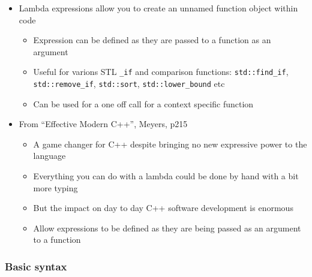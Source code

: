 \begin{itemize}
\tightlist
\item
  Lambda expressions allow you to create an unnamed function object
  within code

  \begin{itemize}
  \tightlist
  \item
    Expression can be defined as they are passed to a function as an
    argument
  \item
    Useful for varions STL \texttt{\_if} and comparison functions:
    \texttt{std::find\_if}, \texttt{std::remove\_if},
    \texttt{std::sort}, \texttt{std::lower\_bound} etc
  \item
    Can be used for a one off call for a context specific function
  \end{itemize}
\item
  From ``Effective Modern C++'', Meyers, p215

  \begin{itemize}
  \tightlist
  \item
    A game changer for C++ despite bringing no new expressive power to
    the language
  \item
    Everything you can do with a lambda could be done by hand with a bit
    more typing
  \item
    But the impact on day to day C++ software development is enormous\\
  \item
    Allow expressions to be defined as they are being passed as an
    argument to a function
  \end{itemize}
\end{itemize}

\begin{Shaded}
\begin{Highlighting}[]
\NormalTok{                [](} \NormalTok{; \});}
\end{Highlighting}
\end{Shaded}

\hypertarget{basic-syntax}{%
\subsubsection{Basic syntax}\label{basic-syntax}}

